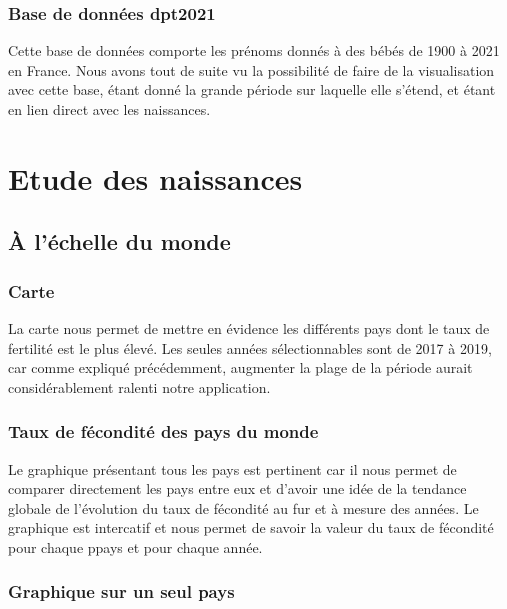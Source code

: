 \documentclass[
]{article}
\begin{document}
\hypertarget{base-de-donnuxe9es-dpt2021}{%
\subsubsection{Base de données
dpt2021}\label{base-de-donnuxe9es-dpt2021}}

Cette base de données comporte les prénoms donnés à des bébés de 1900 à
2021 en France. Nous avons tout de suite vu la possibilité de faire de
la visualisation avec cette base, étant donné la grande période sur
laquelle elle s'étend, et étant en lien direct avec les naissances.

\hypertarget{etude-des-naissances}{%
\section{Etude des naissances}\label{etude-des-naissances}}

\hypertarget{uxe0-luxe9chelle-du-monde}{%
\subsection{À l'échelle du monde}\label{uxe0-luxe9chelle-du-monde}}

\hypertarget{carte}{%
\subsubsection{Carte}\label{carte}}

La carte nous permet de mettre en évidence les différents pays dont le
taux de fertilité est le plus élevé. Les seules années sélectionnables
sont de 2017 à 2019, car comme expliqué précédemment, augmenter la plage
de la période aurait considérablement ralenti notre application.

\hypertarget{taux-de-fuxe9condituxe9-des-pays-du-monde}{%
\subsubsection{Taux de fécondité des pays du
monde}\label{taux-de-fuxe9condituxe9-des-pays-du-monde}}

Le graphique présentant tous les pays est pertinent car il nous permet
de comparer directement les pays entre eux et d'avoir une idée de la
tendance globale de l'évolution du taux de fécondité au fur et à mesure
des années. Le graphique est intercatif et nous permet de savoir la
valeur du taux de fécondité pour chaque ppays et pour chaque année.

\hypertarget{graphique-sur-un-seul-pays}{%
\subsubsection{Graphique sur un seul
pays}\label{graphique-sur-un-seul-pays}}
\end{document}
